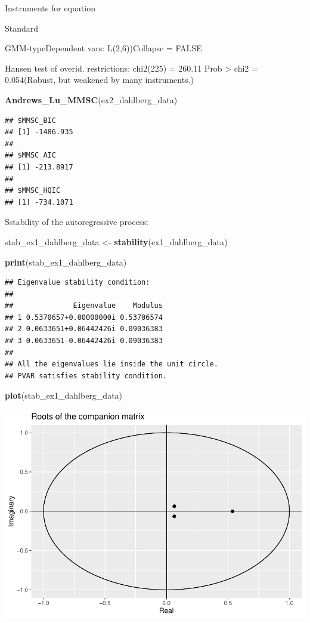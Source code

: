 \documentclass[
]{book}
\newenvironment{Shaded}{\begin{snugshade}}{\end{snugshade}}
\newcommand{\FunctionTok}[1]{\textcolor[rgb]{0.13,0.29,0.53}{\textbf{#1}}}
\newcommand{\NormalTok}[1]{#1}
\newcommand{\OtherTok}[1]{\textcolor[rgb]{0.56,0.35,0.01}{#1}}
\begin{document}
Instruments for equation

Standard

GMM-typeDependent vars: L(2,6))Collapse = FALSE

Hansen test of overid. restrictions: chi2(225) = 260.11 Prob \textgreater{} chi2 = 0.054(Robust, but weakened by many instruments.)

\begin{Shaded}
\begin{Highlighting}[]
\FunctionTok{Andrews\_Lu\_MMSC}\NormalTok{(ex2\_dahlberg\_data)}
\end{Highlighting}
\end{Shaded}

\begin{verbatim}
## $MMSC_BIC
## [1] -1486.935
## 
## $MMSC_AIC
## [1] -213.8917
## 
## $MMSC_HQIC
## [1] -734.1071
\end{verbatim}

Sstability of the autoregressive process:

\begin{Shaded}
\begin{Highlighting}[]
\NormalTok{stab\_ex1\_dahlberg\_data }\OtherTok{\textless{}{-}} \FunctionTok{stability}\NormalTok{(ex1\_dahlberg\_data)}

\FunctionTok{print}\NormalTok{(stab\_ex1\_dahlberg\_data)}
\end{Highlighting}
\end{Shaded}

\begin{verbatim}
## Eigenvalue stability condition:
## 
##              Eigenvalue    Modulus
## 1 0.5370657+0.00000000i 0.53706574
## 2 0.0633651+0.06442426i 0.09036383
## 3 0.0633651-0.06442426i 0.09036383
## 
## All the eigenvalues lie inside the unit circle.
## PVAR satisfies stability condition.
\end{verbatim}

\begin{Shaded}
\begin{Highlighting}[]
\FunctionTok{plot}\NormalTok{(stab\_ex1\_dahlberg\_data)}
\end{Highlighting}
\end{Shaded}

\includegraphics{Notas-Series-Tiempo_files/figure-latex/unnamed-chunk-60-1.pdf}
\end{document}
